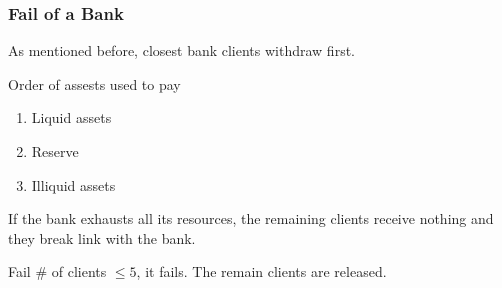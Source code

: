 \begin{frame}
    \frametitle{Fail of a Bank}
    As mentioned before, closest bank clients withdraw first.

    \begin{block}{Order of assests used to pay}
        \begin{enumerate}
            \item Liquid assets
            \item Reserve 
            \item Illiquid assets
        \end{enumerate}
    \end{block}

    If the bank exhausts all its resources, the remaining clients receive nothing and they break link with the bank.

    \begin{block}{Fail}
        \# of clients $\le 5$, it fails. The remain clients are released.
    \end{block}

\end{frame}